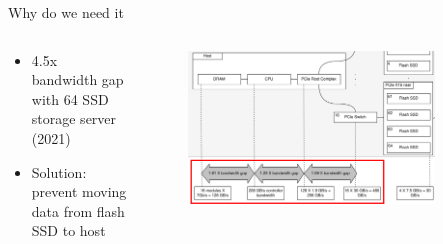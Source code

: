 \documentclass[aspectratio=169]{beamer}
\begin{document}
\begin{frame}{Why do we need it}
    \begin{columns}
        \begin{column}{0.3\textwidth}
            \footnotesize
            \begin{itemize}
                \item 4.5x bandwidth gap with 64 SSD storage server (2021)
                \item Solution: prevent moving data from flash SSD to host
            \end{itemize}
        \end{column}
        \begin{column}{0.7\textwidth}
            \begingroup
            \small
            \begin{figure}
                \centering
                \includegraphics[width=0.87\textwidth]{resources/images/storage-bottleneck2.png}
            \end{figure}
            \endgroup
        \end{column}
    \end{columns}
\end{frame}
\end{document}
